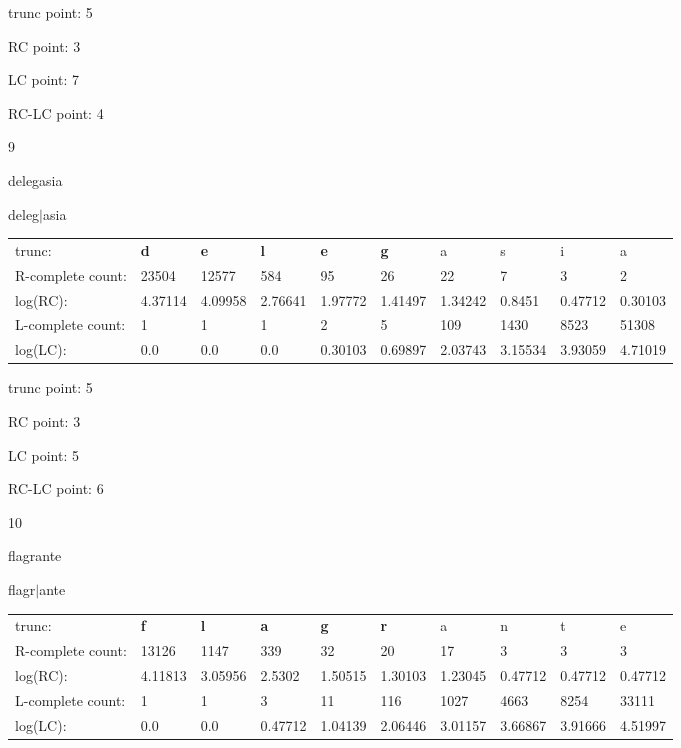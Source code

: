 \documentclass{article}
\begin{document}
trunc point: 5

RC point: 3

LC point: 7

RC-LC point: 4

\vspace{3em}



9

delegasia

deleg$|$asia

\vspace{1em}

\begin{tabular}{l|lllllllll}

trunc: & {\color{red}\bf d} & {\color{red}\bf e} & {\color{red}\bf l} & {\color{red}\bf e} & {\color{red}\bf g} & a & s & i & a \\ 
R-complete count: & 23504 & 12577 & 584 & 95 & 26 & 22 & 7 & 3 & 2 \\ 
log(RC): & 4.37114 & 4.09958 & 2.76641 & 1.97772 & 1.41497 & 1.34242 & 0.8451 & 0.47712 & 0.30103 \\ 
L-complete count: & 1 & 1 & 1 & 2 & 5 & 109 & 1430 & 8523 & 51308 \\ 
log(LC): & 0.0 & 0.0 & 0.0 & 0.30103 & 0.69897 & 2.03743 & 3.15534 & 3.93059 & 4.71019 \\ 
\end{tabular}

trunc point: 5

RC point: 3

LC point: 5

RC-LC point: 6

\vspace{3em}



10

flagrante

flagr$|$ante

\vspace{1em}

\begin{tabular}{l|lllllllll}

trunc: & {\color{red}\bf f} & {\color{red}\bf l} & {\color{red}\bf a} & {\color{red}\bf g} & {\color{red}\bf r} & a & n & t & e \\ 
R-complete count: & 13126 & 1147 & 339 & 32 & 20 & 17 & 3 & 3 & 3 \\ 
log(RC): & 4.11813 & 3.05956 & 2.5302 & 1.50515 & 1.30103 & 1.23045 & 0.47712 & 0.47712 & 0.47712 \\ 
L-complete count: & 1 & 1 & 3 & 11 & 116 & 1027 & 4663 & 8254 & 33111 \\ 
log(LC): & 0.0 & 0.0 & 0.47712 & 1.04139 & 2.06446 & 3.01157 & 3.66867 & 3.91666 & 4.51997 \\ 
\end{tabular}
\end{document}

